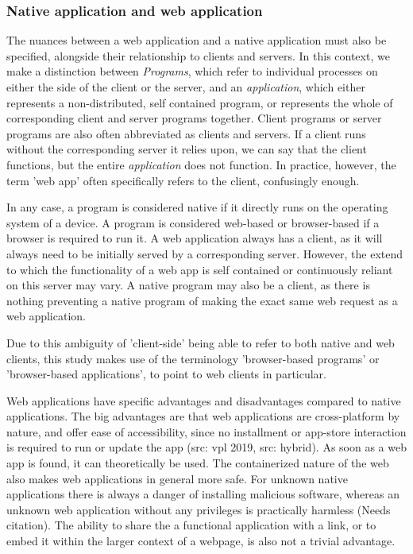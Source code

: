 \subsubsection*{Native application and web application}

The nuances between a web application and a native application must also be specified, alongside their relationship to clients and servers. 
In this context, we make a distinction between \emph{Programs}, which refer to individual processes on either the side of the client or the server, and an \emph{application}, which either represents a non-distributed, self contained program, or represents the whole of corresponding client and server programs together.
Client programs or server programs are also often abbreviated as clients and servers.  
If a client runs without the corresponding server it relies upon, we can say that the client functions, but the entire \emph{application} does not function. 
In practice, however, the term 'web app' often specifically refers to the client, confusingly enough.

In any case, a program is considered native if it directly runs on the operating system of a device.
A program is considered web-based or browser-based if a browser is required to run it. 
A web application always has a client, as it will always need to be initially served by a corresponding server.
However, the extend to which the functionality of a web app is self contained or continuously reliant on this server may vary.
A native program may also be a client, as there is nothing preventing a native program of making the exact same web request as a web application. 

Due to this ambiguity of 'client-side' being able to refer to both native and web clients, this study makes use of the terminology 'browser-based programs' or 'browser-based applications', to point to web clients in particular. 

Web applications have specific advantages and disadvantages compared to native applications. 
The big advantages are that web applications are cross-platform by nature, and offer ease of accessibility, since no installment or app-store interaction is required to run or update the app (src: vpl 2019, src: hybrid).
As soon as a web app is found, it can theoretically be used.
The containerized nature of the web also makes web applications in general more safe. 
For unknown native applications there is always a danger of installing malicious software, whereas an unknown web application without any privileges is practically harmless (Needs citation). 
The ability to share the a functional application with a link, or to embed it within the larger context of a webpage, is also not a trivial advantage.

